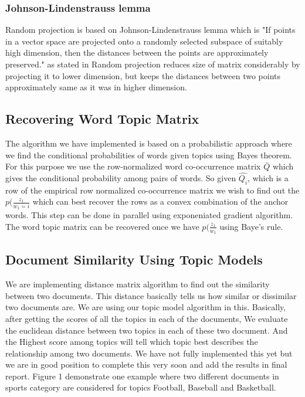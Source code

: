 \documentclass[a4paper,11pt]{article}
\begin{document}
\subsubsection{Johnson-Lindenstrauss lemma}
Random projection is based on Johnson-Lindenstrauss lemma which is "If points in a vector space are projected onto a randomly selected subspace of suitably high dimension, then the distances between the points are approximately preserved." as stated in \cite{Random projection} Random projection reduces size of matrix considerably by projecting it to lower dimension, but keeps the distances between two points approximately same as it was in higher dimension.


\subsection{Recovering Word Topic Matrix}
The algorithm we have implemented is based on a probabilistic approach where we find the conditional probabilities of words given topics using Bayes theorem. For this purpose we use the row-normalized word co-occurrence matrix $\bar{Q}$ which gives the conditional probability among pairs of words. So given $\hat{Q_{i}}$, which is a row of the empirical row normalized co-occurrence matrix we wish to find out the $p(\frac{z_{1}}{w_{1}=i}$ which can best recover the rows as a convex combination of the anchor words. This step can be done in parallel using exponeniated gradient algorithm. The word topic matrix can be recovered once we have $p(\frac{z_{1}}{w_{1}}$ using Baye's rule. 

\subsection{Document Similarity Using Topic Models}
We are implementing distance matrix algorithm to find out the similarity between two documents. This distance basically tells us how similar or dissimilar two documents are. We are using our topic model algorithm in this. Basically, after getting the scores of all the topics in each of the documents, We evaluate the euclidean distance between two topics in each of these two document. And the Highest score among topics will tell which topic best describes the relationship among two documents. We have not fully implemented this yet but we are in good position to complete this very soon and add the results in final report. Figure 1 demonstrate one example where two different documents in sports category are considered for topics Football, Baseball and Basketball. 
\end{document}
